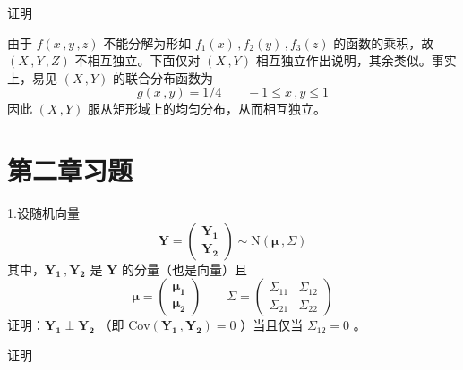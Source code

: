 \documentclass[12pt,hyperref,]{ctexart}
\begin{document}
\vspace{1em}

\heiti

证明

\songti

由于 \(f(x\, ,y\, ,z)\) 不能分解为形如 \(f_1(x)\, ,f_2(y)\, ,f_3(z)\)
的函数的乘积，故 \((X\, ,Y\, ,Z)\) 不相互独立。下面仅对 \((X\, ,Y)\)
相互独立作出说明，其余类似。事实上，易见 \((X\, ,Y)\) 的联合分布函数为
\begin{equation*}
g(x\, ,y)=1/4 \qquad-1\le x\, ,y\le 1
\end{equation*}因此 \((X\, ,Y)\) 服从矩形域上的均匀分布，从而相互独立。

\newpage

\heiti

\hypertarget{section-4}{%
\section{第二章习题}\label{section-4}}

\kaishu

1.设随机向量 \begin{equation*}
\boldsymbol{Y}=
\begin{pmatrix}
\boldsymbol{Y_1} \\
\boldsymbol{Y_2}
\end{pmatrix} \sim \mathrm{N}(\boldsymbol{\mu}\, , \Sigma)
\end{equation*}其中，\(\boldsymbol{Y_1}\, ,\boldsymbol{Y_2}\) 是
\(\boldsymbol{Y}\) 的分量（也是向量）且 \begin{equation*}
\boldsymbol{\mu}=
\begin{pmatrix}
\boldsymbol{\mu_1} \\
\boldsymbol{\mu_2}
\end{pmatrix} \qquad
\Sigma=
\begin{pmatrix}
\Sigma_{11} & \Sigma_{12} \\
\Sigma_{21} & \Sigma_{22}
\end{pmatrix}
\end{equation*}证明：\(\boldsymbol{Y_1}\perp \boldsymbol{Y_2}\) （即
\(\mathrm{Cov}(\boldsymbol{Y_1}\, ,\boldsymbol{Y_2})=0\) ）当且仅当
\(\Sigma_{12}=0\) 。

\vspace{1em}

\heiti

证明

\songti
\end{document}
